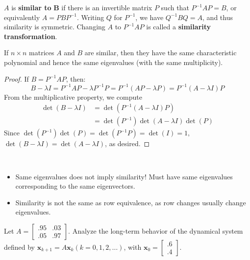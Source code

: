 \documentclass[11pt]{scrartcl}
\theoremstyle{dotlessP}
\theoremstyle{dotlessN}
\begin{document}
\begin{definition}
	$A$ is \textbf{similar to} \textbf{B} if there is an invertible matrix $P$ such that $P^{-1} A P = B$, or equivalently  $A = PBP^{-1}$. Writing  $Q$ for $P^{-1}$, we have $Q^{-1}BQ = A$, and  thus similarity is symmetric. Changing $A$ to $P^{-1}AP$ is called a \textbf{similarity transformation}.
\end{definition}
\begin{theorem}
	If $n \times n$ matrices $A$ and $B$ are similar, then they have the same characteristic polynomial and hence the same eigenvalues (with the same multiplicity).
\end{theorem}
\begin{proof}
	If $B = P^{-1}AP$, then:
	 \[
		 B - \lambda I = P^{-1}AP - \lambda P^{-1}P = P^{-1}(AP - \lambda P) = P^{-1}(A- \lambda I)P
	\] 
	From the multiplicative property, we compute
	\begin{align*}
		\det (B - \lambda I ) &= \det (P^{-1}(A - \lambda I) P) \\
							  &= \det(P^{-1}) \det(A - \lambda I) \det(P)
	\end{align*}
	Since $\det(P^{-1})\det(P) = \det(P^{-1}P) = \det(I) = 1$, $\det(B - \lambda I) = \det(A - \lambda I)$, as desired.
\end{proof}
\begin{remark} \ 
	\begin{itemize}
		\item Same eigenvalues does not imply similarity! Must have same eigenvalues corresponding to the same eigenvectors.
		\item Similarity is not the same as row equivalence, as row changes usually change eigenvalues.
	\end{itemize}
\end{remark}
\begin{example}
	Let $A =
\begin{bmatrix}
	.95 & .03 \\
	.05 & .97
\end{bmatrix}
$. Analyze the long-term behavior of the dynamical system defined by $\bm{x}_{k+1} = A\bm{x}_k (k = 0,1,2,\dots)$, with  $\bm{x}_0 = 
\begin{bmatrix}
	.6 \\
	.4
\end{bmatrix}
$.
\end{example}
\end{document}
